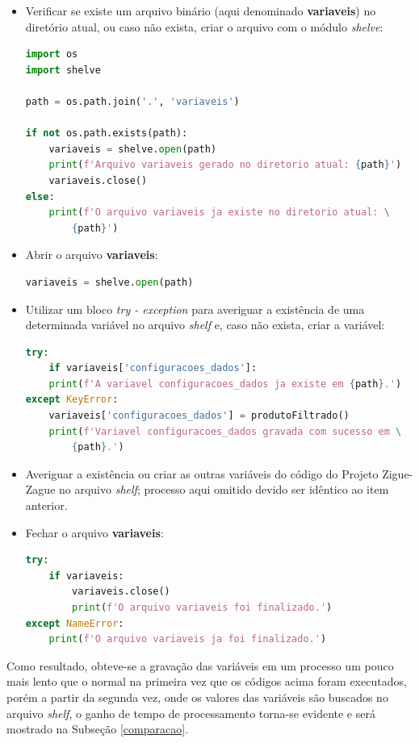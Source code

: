 \documentclass[12pt]{article}
\begin{document}
\begin{itemize}
	\item Verificar se existe um arquivo binário (aqui denominado \textbf{variaveis}) no diretório atual, ou caso não exista, criar o arquivo com o módulo \textit{shelve}:
\begin{lstlisting}[language=Python]
import os
import shelve

path = os.path.join('.', 'variaveis')

if not os.path.exists(path):
	variaveis = shelve.open(path)
	print(f'Arquivo variaveis gerado no diretorio atual: {path}')
	variaveis.close()
else:
	print(f'O arquivo variaveis ja existe no diretorio atual: \
		{path}')
\end{lstlisting}
	
	\item Abrir o arquivo \textbf{variaveis}:
\begin{lstlisting}[language=Python]
variaveis = shelve.open(path)
\end{lstlisting} 
	
	\item Utilizar um bloco \textit{try - exception} para averiguar a existência de uma determinada variável no arquivo \textit{shelf} e, caso não exista, criar a variável:
\begin{lstlisting}[language=Python]
try:
	if variaveis['configuracoes_dados']:
	print(f'A variavel configuracoes_dados ja existe em {path}.')
except KeyError:
	variaveis['configuracoes_dados'] = produtoFiltrado()
	print(f'Variavel configuracoes_dados gravada com sucesso em \
		{path}.')
\end{lstlisting}
	
	\item Averiguar a existência ou criar as outras variáveis do código do Projeto Zigue-Zague no arquivo \textit{shelf}; processo aqui omitido devido ser idêntico ao item anterior.
	
	\item Fechar o arquivo \textbf{variaveis}:
\begin{lstlisting}[language=Python]
try:
	if variaveis:
		variaveis.close()
		print(f'O arquivo variaveis foi finalizado.')
except NameError:
	print(f'O arquivo variaveis ja foi finalizado.')
\end{lstlisting}
\end{itemize}

Como resultado, obteve-se a gravação das variáveis em um processo um pouco mais lento que o normal na primeira vez que os códigos acima foram executados, porém a partir da segunda vez, onde os valores das variáveis são buscados no arquivo \textit{shelf}, o ganho de tempo de processamento torna-se evidente e será mostrado na Subseção \ref{comparacao}.
\end{document}
